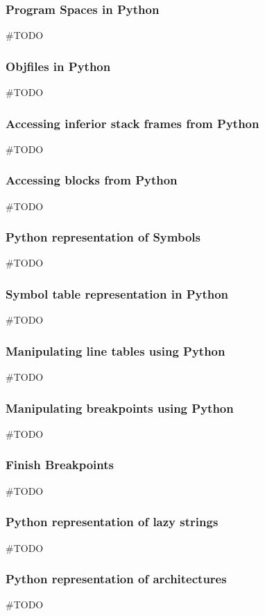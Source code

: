 \subsubsection{Program Spaces in Python}
\#TODO

\subsubsection{Objfiles in Python}
\#TODO

\subsubsection{Accessing inferior stack frames from Python}
\#TODO

\subsubsection{Accessing blocks from Python}
\#TODO

\subsubsection{Python representation of Symbols}
\#TODO

\subsubsection{Symbol table representation in Python}
\#TODO

\subsubsection{Manipulating line tables using Python}
\#TODO

\subsubsection{Manipulating breakpoints using Python}
\#TODO

\subsubsection{Finish Breakpoints}
\#TODO

\subsubsection{Python representation of lazy strings}
\#TODO

\subsubsection{Python representation of architectures}
\#TODO
